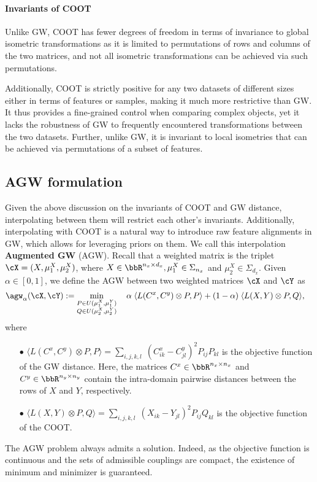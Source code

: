 \paragraph{Invariants of COOT} Unlike GW, COOT has fewer degrees of freedom
in terms of invariance to global isometric transformations as it is limited to
permutations of rows and columns of the two matrices, and not all isometric transformations
can be achieved via such permutations.

Additionally, COOT is strictly positive for any two datasets of different sizes either
in terms of features or samples, making it much more restrictive than GW.
It thus provides a fine-grained control when comparing complex objects,
yet it lacks the robustness of GW to frequently encountered transformations
between the two datasets. Further, unlike GW, it is invariant to local isometries
that can be achieved via permutations of a subset of features.

\subsection{AGW formulation} \label{subsec:agw_formulation}
Given the above discussion on the invariants of COOT and GW distance,
interpolating between them will restrict each other's invariants. Additionally,
interpolating with COOT is a natural way to introduce raw feature alignments in GW,
which allows for leveraging priors on them. We call this interpolation \textbf{Augmented GW} (AGW).
Recall that a weighted matrix is the triplet $\cX = (X, \mu_1^X, \mu_2^X)$, where
$X \in \bbR^{n_x \times d_x}, \mu_1^X \in \Sigma_{n_x}$ and $\mu_2^X \in \Sigma_{d_x}$.
Given $\alpha \in [0,1]$, we define the AGW between two weighted matrices $\cX$ and $\cY$ as
\begin{align}
\label{eq:scootr}
\agw_{\alpha}(\cX, \cY) &:=
\min_{\substack{P \in U(\mu_1^X, \mu_1^Y) \\ Q \in U(\mu_2^X,\mu_2^Y)}} \quad
\alpha \; \langle L(C^x,C^y) \otimes P, P \rangle + (1-\alpha) \; \langle L(X,Y) \otimes P, Q \rangle,
\end{align}
where
\begin{itemize}
    \item[$\bullet$] $\langle L(C^x,C^y) \otimes P, P \rangle
    = \sum_{i,j,k,l} \; (C^x_{ik} - C^y_{jl})^2 P_{ij} P_{kl}$ is the objective function of
    the GW distance. Here, the matrices $C^x \in \bbR^{n_x \times n_x}$ and
    $C^y \in \bbR^{n_y \times n_y}$
    contain the intra-domain pairwise distances between the rows of $X$ and $Y$, respectively.

    \item[$\bullet$] $\langle L(X,Y) \otimes P, Q \rangle =
    \sum_{i,j,k,l} \; (X_{ik} - Y_{jl})^2 P_{ij} Q_{kl}$ is the objective function of the COOT.
\end{itemize}
The AGW problem always admits a solution. Indeed, as the objective function is continuous
and the sets of admissible couplings are compact, the existence of minimum and minimizer
is guaranteed.

